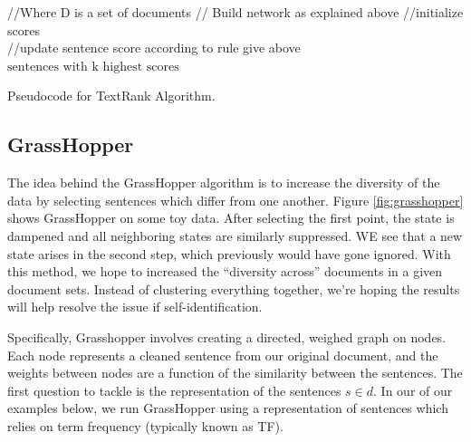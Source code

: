 \documentclass[10pt]{article}
\begin{document}
\begin{algorithm}
  \begin{algorithmic}
     //Where D is a set of documents
     // Build network as explained above
     //initialize scores
     \\
     \indent  \indent //update sentence score according to rule give above
      \EndIf
     \EndFor
     \EndWhile
 \Return $\text{sentences with k highest scores}$

    \EndProcedure{}
  \end{algorithmic}
  \caption{Pseudocode for TextRank Algorithm.}
\end{algorithm}

\subsection{GrassHopper}
The idea behind the {\sc GrassHopper} algorithm is to increase the diversity of the data by selecting sentences which differ from one another. Figure \ref{fig:grasshopper} shows {\sc GrassHopper} on some toy data. After selecting the first point, the state is dampened and all neighboring states are similarly suppressed. WE see that a new state arises in the second step, which previously would have gone ignored. With this method, we hope to increased the ``diversity across'' documents in a given document sets. Instead of clustering everything together, we're hoping the results will help resolve the issue if self-identification.

Specifically, Grasshopper involves creating a directed, weighed graph on  nodes. Each node represents a cleaned sentence from our original document, and the weights between nodes are a function of the similarity between the sentences. The first question to tackle is the representation of the sentences $s \in d$. In our of our examples below, we run {\sc GrassHopper} using a representation of sentences which relies on term frequency (typically known as TF). \\
\end{document}
